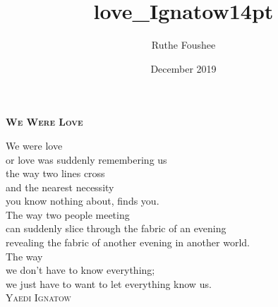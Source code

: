 \documentclass[14pt]{memoir}
\title{love_Ignatow14pt}
\author{Ruthe Foushee}
\date{December 2019}
\begin{document}
\thispagestyle{empty}
\textbf{\textsc{\large We Were Love}}
\vspace{26pt}

We were love\\
or love was suddenly remembering us\\
the way two lines cross\\
and the nearest necessity\\
you know nothing about, finds you.\\
The way two people meeting\\
can suddenly slice through the fabric of an evening\\
revealing the fabric of another evening in another world.\\
The way\\
we don’t have to know everything;\\
we just have to want to let everything know us.\\

\vspace{11pt}
\hspace{90pt} \textsc{Yaedi Ignatow}\\
\vfill
\end{document}
